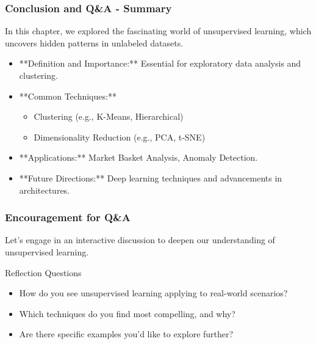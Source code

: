 \documentclass[aspectratio=169]{beamer}
\begin{document}
\begin{frame}[fragile]
    \frametitle{Conclusion and Q\&A - Summary}
    In this chapter, we explored the fascinating world of unsupervised learning, which uncovers hidden patterns in unlabeled datasets.
    \begin{itemize}
        \item **Definition and Importance:** Essential for exploratory data analysis and clustering.
        \item **Common Techniques:**
        \begin{itemize}
            \item Clustering (e.g., K-Means, Hierarchical)
            \item Dimensionality Reduction (e.g., PCA, t-SNE)
        \end{itemize}
        \item **Applications:** Market Basket Analysis, Anomaly Detection.
        \item **Future Directions:** Deep learning techniques and advancements in architectures.
    \end{itemize}
\end{frame}

\begin{frame}[fragile]
    \frametitle{Encouragement for Q\&A}
    Let’s engage in an interactive discussion to deepen our understanding of unsupervised learning.
    \begin{block}{Reflection Questions}
        \begin{itemize}
            \item How do you see unsupervised learning applying to real-world scenarios?
            \item Which techniques do you find most compelling, and why?
            \item Are there specific examples you’d like to explore further?
        \end{itemize}
    \end{block}
\end{frame}
\end{document}
